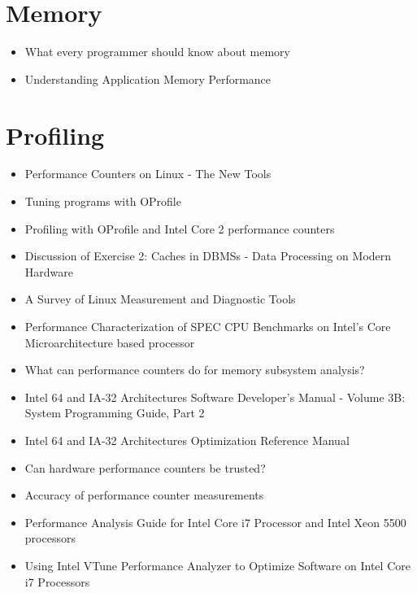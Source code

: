 \section{Memory}
\label{sec:lr-memory}

\begin{itemize}
\item What every programmer should know about memory
  \cite{Drepper2007}
\item Understanding Application Memory Performance \cite{Drepper2008}
\end{itemize}


\section{Profiling}
\label{sec:lr-profiling}

\begin{itemize}
\item Performance Counters on Linux - The New Tools \cite{Melo2009}
\item Tuning programs with OProfile \cite{Cohen2004}
\item Profiling with OProfile and Intel Core 2 performance counters
  \cite{Nielsen2008}
\item Discussion of Exercise 2: Caches in DBMSs - Data Processing on
  Modern Hardware \cite{Muller2009}
\item A Survey of Linux Measurement and Diagnostic Tools
  \cite{Rowand2009}
\item Performance Characterization of SPEC CPU Benchmarks on Intel's
  Core Microarchitecture based processor \cite{Bird2007}
\item What can performance counters do for memory subsystem analysis?
  \cite{Eranian2008}
\item Intel \textsuperscript{\textregistered} 64 and IA-32
  Architectures Software Developer’s Manual - Volume 3B: System
  Programming Guide, Part 2 \cite{Intel2010}
\item Intel \textsuperscript{\textregistered} 64 and IA-32
  Architectures Optimization Reference Manual \cite{Intel2009}
\item Can hardware performance counters be trusted? \cite{Weaver2008}
\item Accuracy of performance counter measurements
  \cite{Zaparanuks2008}
\item Performance Analysis Guide for Intel
  \textsuperscript{\textregistered} Core
  \textsuperscript{\texttrademark} i7 Processor and Intel
  \textsuperscript{\textregistered} Xeon
  \textsuperscript{\texttrademark} 5500 processors
  \cite{Levinthal2009}
\item Using Intel \textsuperscript{\textregistered} VTune
  \textsuperscript{\texttrademark} Performance Analyzer to Optimize
  Software on Intel \textsuperscript{\textregistered} Core
  \textsuperscript{\texttrademark} i7 Processors \cite{Intel2009a}
\end{itemize}


